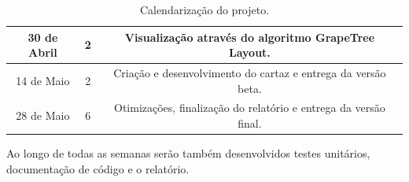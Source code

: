 \documentclass[10pt]{article}
\begin{document}
\begin{table}[!h]
\begin{tabular}{| c | c | c |}
        \hline
        30 de Abril     & 2                                                         & Visualização através do algoritmo GrapeTree Layout.              \\
        \hline
        14 de Maio      & 2                                                         & Criação e desenvolvimento do cartaz e entrega da versão beta.    \\
        \hline
        28 de Maio      & 6                                                         & Otimizações, finalização do relatório e entrega da versão final. \\
        \hline
    \end{tabular}
    \caption{Calendarização do projeto.}
    \label{calendar}
\end{table}

Ao longo de todas as semanas serão também desenvolvidos testes unitários, documentação de código e o relatório.

%
%

\begin{thebibliography}{9}


\end{thebibliography}
\end{document}
